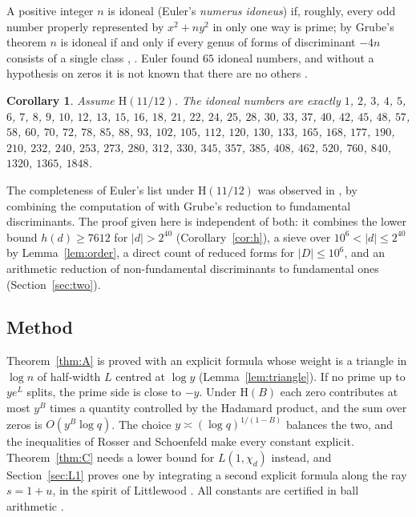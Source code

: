 \documentclass[11pt]{amsart}
\newtheorem{introcor}[introthm]{Corollary}
\theoremstyle{definition}
\theoremstyle{remark}
\numberwithin{equation}{section}
\newcommand{\Hyp}{\mathrm{H}}
\begin{document}
A positive integer $n$ is idoneal (Euler's \emph{numerus idoneus}) if, roughly, every odd number properly represented by $x^2+ny^2$ in only one way is prime; by Grube's theorem $n$ is idoneal if and only if every genus of forms of discriminant $-4n$ consists of a single class \cite{Kan11}, \cite[Theorem 3.22 and Proposition 3.24]{Cox13}. Euler found $65$ idoneal numbers, and without a hypothesis on zeros it is not known that there are no others \cite{Kan11}.

\begin{introcor}\label{cor:idoneal}
Assume $\Hyp(11/12)$. The idoneal numbers are exactly
$1$, $2$, $3$, $4$, $5$, $6$, $7$, $8$, $9$, $10$, $12$, $13$, $15$, $16$, $18$, $21$, $22$, $24$, $25$, $28$, $30$, $33$, $37$, $40$, $42$, $45$, $48$, $57$, $58$, $60$, $70$, $72$, $78$, $85$, $88$, $93$, $102$, $105$, $112$, $120$, $130$, $133$, $165$, $168$, $177$, $190$, $210$, $232$, $240$, $253$, $273$, $280$, $312$, $330$, $345$, $357$, $385$, $408$, $462$, $520$, $760$, $840$, $1320$, $1365$, $1848$.
\end{introcor}

The completeness of Euler's list under $\Hyp(11/12)$ was observed in \cite{OAI-b}, by combining the computation of \cite{EKN20} with Grube's reduction to fundamental discriminants. The proof given here is independent of both: it combines the lower bound $h(d)\ge 7612$ for $|d|>2^{40}$ (Corollary~\ref{cor:h}), a sieve over $10^6<|d|\le2^{40}$ by Lemma~\ref{lem:order}, a direct count of reduced forms for $|D|\le10^6$, and an arithmetic reduction of non-fundamental discriminants to fundamental ones (Section~\ref{sec:two}).

\subsection*{Method}
Theorem~\ref{thm:A} is proved with an explicit formula whose weight is a triangle in $\log n$ of half-width $L$ centred at $\log y$ (Lemma~\ref{lem:triangle}). If no prime up to $ye^L$ splits, the prime side is close to $-y$. Under $\Hyp(B)$ each zero contributes at most $y^B$ times a quantity controlled by the Hadamard product, and the sum over zeros is $O(y^B\log q)$. The choice $y\asymp(\log q)^{1/(1-B)}$ balances the two, and the inequalities of Rosser and Schoenfeld \cite{RS62} make every constant explicit. Theorem~\ref{thm:C} needs a lower bound for $L(1,\chi_d)$ instead, and Section~\ref{sec:L1} proves one by integrating a second explicit formula along the ray $s=1+u$, in the spirit of Littlewood \cite{Lit28}. All constants are certified in ball arithmetic \cite{Joh17}.
\end{document}
